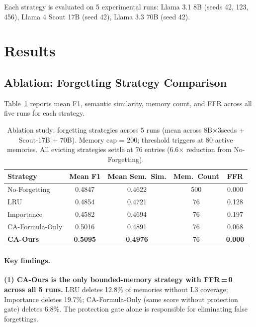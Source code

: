 \documentclass{article}
\begin{document}
Each strategy is evaluated on 5 experimental runs: Llama 3.1 8B (seeds 42,
123, 456), Llama 4 Scout 17B (seed 42), Llama 3.3 70B (seed 42).

\section{Results}
\label{sec:results}

\subsection{Ablation: Forgetting Strategy Comparison}
\label{sec:ablation}

Table~\ref{tab:ablation} reports mean F1, semantic similarity, memory count,
and FFR across all five runs for each strategy.

\begin{table}[h]
\centering
\caption{Ablation study: forgetting strategies across 5 runs (mean across 8B$\times$3seeds + Scout-17B + 70B).
Memory cap = 200; threshold triggers at 80 active memories.  All evicting
strategies settle at 76 entries (6.6$\times$ reduction from No-Forgetting).}
\label{tab:ablation}
\begin{tabular}{lcccc}
\toprule
Strategy & Mean F1 & Mean Sem.\ Sim. & Mem.\ Count & FFR \\
\midrule
No-Forgetting         & 0.4847 & 0.4622 & 500  & 0.000 \\
LRU                   & 0.4854 & 0.4721 & 76   & 0.128 \\
Importance            & 0.4582 & 0.4694 & 76   & 0.197 \\
CA-Formula-Only       & 0.5016 & 0.4891 & 76   & 0.068 \\
\textbf{CA-Ours}      & \textbf{0.5095} & \textbf{0.4976} & 76 & \textbf{0.000} \\
\bottomrule
\end{tabular}
\end{table}

\paragraph{Key findings.}
\textbf{(1) CA-Ours is the only bounded-memory strategy with FFR\,=\,0 across all
5 runs.}  LRU deletes 12.8\% of memories without L3 coverage; Importance
deletes 19.7\%; CA-Formula-Only (same score without protection gate) deletes
6.8\%.  The protection gate alone is responsible for eliminating false
forgettings.
\end{document}
